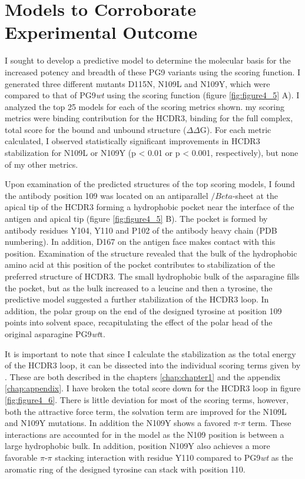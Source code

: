\section{Models to Corroborate Experimental Outcome}
I sought to develop a predictive model to determine the molecular basis for the increased potency and breadth of these PG9 variants using the \rosetta scoring function. I generated three different mutants D115N, N109L and N109Y, which were compared to that of PG9\textit{wt} using the \rosetta scoring function (figure \ref{fig:figure4_5} A). I analyzed the top 25 models for each of the scoring metrics shown. my scoring metrics were binding contribution for the HCDR3, binding for the full complex, total score for the bound and unbound structure ($\Delta\Delta$G). For each metric calculated, I observed statistically significant improvements in HCDR3 stabilization for N109L or N109Y (p < 0.01 or p < 0.001, respectively), but none of my other metrics.

Upon examination of the predicted structures of the top scoring models, I found the antibody position 109 was located on an antiparallel $/Beta$-sheet at the apical tip of the HCDR3 forming a hydrophobic pocket near the interface of the antigen and apical tip (figure \ref{fig:figure4_5} B). The pocket is formed by antibody residues Y104, Y110 and P102 of the antibody heavy chain (PDB numbering). In addition, D167 on the antigen face makes contact with this position. Examination of the structure revealed that the bulk of the hydrophobic amino acid at this position of the pocket contributes to stabilization of the preferred structure of HCDR3. The small hydrophobic bulk of the asparagine fills the pocket, but as the bulk increased to a leucine and then a tyrosine, the predictive model suggested a further stabilization of the HCDR3 loop. In addition, the polar group on the end of the designed tyrosine at position 109 points into solvent space, recapitulating the effect of the polar head of the original asparagine PG9\textit{wt}t.

It is important to note that since I calculate the stabilization as the total energy of the HCDR3 loop, it can be dissected into the individual scoring terms given by \rosetta. These are both described in the chapters \ref{chap:chapter1} and the appendix \ref{chap:appendix}. I have broken the total score down for the HCDR3 loop in figure \ref{fig:figure4_6}. There is little deviation for most of the scoring terms, however, both the attractive force term, the solvation term are improved for the N109L and N109Y mutations. In addition the N109Y shows a favored $\pi$-$\pi$ term. These interactions are accounted for in the model as the N109 position is between a large hydrophobic bulk. In addition, position N109Y also achieves a more favorable $\pi$-$\pi$ stacking interaction with residue Y110 compared to PG9\textit{wt} as the aromatic ring of the designed tyrosine can stack with position 110.

